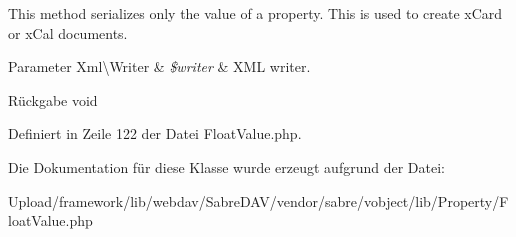This method serializes only the value of a property. This is used to create x\+Card or x\+Cal documents.


\begin{DoxyParams}[1]{Parameter}
Xml\textbackslash{}\+Writer & {\em \$writer} & X\+ML writer.\\
\hline
\end{DoxyParams}
\begin{DoxyReturn}{Rückgabe}
void 
\end{DoxyReturn}


Definiert in Zeile 122 der Datei Float\+Value.\+php.



Die Dokumentation für diese Klasse wurde erzeugt aufgrund der Datei\+:\begin{DoxyCompactItemize}
\item 
Upload/framework/lib/webdav/\+Sabre\+D\+A\+V/vendor/sabre/vobject/lib/\+Property/Float\+Value.\+php\end{DoxyCompactItemize}

